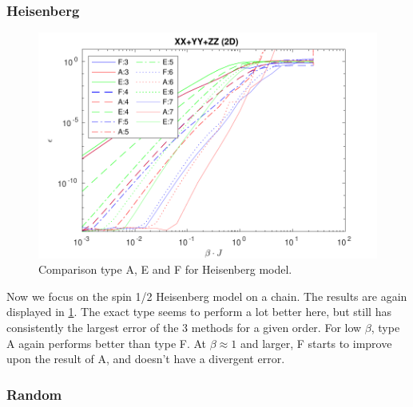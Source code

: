 \subsubsection{Heisenberg}

\begin{figure}[!htbp]
    \center
    \includegraphics[width=\textwidth]{Figuren/benchmarking/t_heis_XXX.pdf}
    \caption{Comparison type A, E and F for Heisenberg model.}
    \label{fig:benchmark:tHeisenberg}
\end{figure}

Now we focus on the spin 1/2 Heisenberg model on a chain. The results are again displayed in \cref{fig:benchmark:tHeisenberg}. The exact type seems to perform a lot better here, but still has consistently the largest error of the 3 methods for a given order. For low $\beta$, type A again performs better than type F. At $\beta \approx 1$ and larger, F starts to improve upon the result of A, and doesn't have a divergent error.

\subsubsection{Random}

